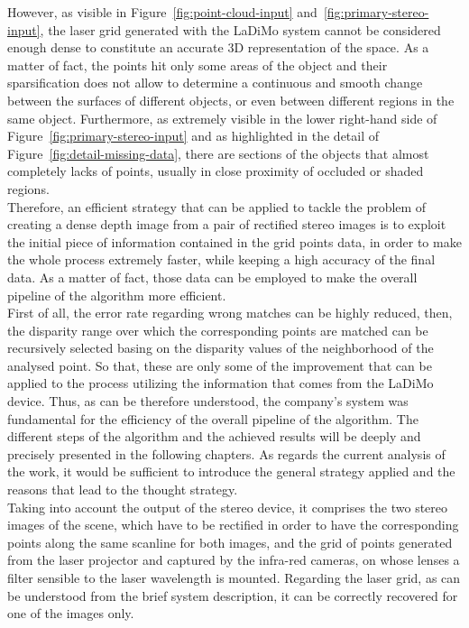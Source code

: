 However, as visible in Figure~\ref{fig:point-cloud-input} and~\ref{fig:primary-stereo-input}, the laser grid generated with the LaDiMo system cannot be considered enough dense to constitute an accurate 3D representation of the space. 
As a matter of fact, the points hit only some areas of the object and their sparsification does not allow to determine a continuous and smooth change between the surfaces of different objects, or even between different regions in the same object.
Furthermore, as extremely visible in the lower right-hand side of Figure~\ref{fig:primary-stereo-input} and as highlighted in the detail of Figure~\ref{fig:detail-missing-data}, there are sections of the objects that almost completely lacks of points, usually in close proximity of occluded or shaded regions.\\
Therefore, an efficient strategy that can be applied to tackle the problem of creating a dense depth image from a pair of rectified stereo images is to exploit the initial piece of information contained in the grid points data, in order to make the whole process extremely faster, while keeping a high accuracy of the final data.
As a matter of fact, those data can be employed to make the overall pipeline of the algorithm more efficient. \\
First of all, the error rate regarding wrong matches can be highly reduced, then, the disparity range over which the corresponding points are matched can be recursively selected basing on the disparity values of the neighborhood of the analysed point. 
So that, these are only some of the improvement that can be applied to the process utilizing the information that comes from the LaDiMo device.
Thus, as can be therefore understood, the company's system was fundamental for the efficiency of the overall pipeline of the algorithm.
The different steps of the algorithm and the achieved results will be deeply and precisely presented in the following chapters. 
As regards the current analysis of the work, it would be sufficient to introduce the general strategy applied and the reasons that lead to the thought strategy.\\
Taking into account the output of the stereo device, it comprises the two stereo images of the scene, which have to be rectified in order to have the corresponding points along the same scanline for both images, and the grid of points generated from the laser projector and captured by the infra-red cameras, on whose lenses a filter sensible to the laser wavelength is mounted.
Regarding the laser grid, as can be understood from the brief system description, it can be correctly recovered for one of the images only. 
